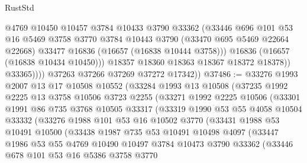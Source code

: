 \begin{lexlean}{RustStd}
\begin{coremodule}
                      @4769
                      @10450
                      @10457
                      @3784
                      @10433
                      @3790
                      @33362
                      (@33446
                        @696
                        @101
                        @53
                        @16
                        @5469
                        @3758
                        @3770
                        @3784
                        @10443
                        @3790
                        (@33470 @695 @5469 @22664 @22668)
                        @33477
                        @16836
                        (@16657 (@16838 @10444 @3758)))
                      @16836
                      (@16657 (@16838 @10434 @10450)))
                    @18357
                    @18360
                    @18363
                    @18367
                    @18372
                    @18378))
                @33365))))
        @37263
        @37266
        @37269
        @37272
        @17342))
@37486 := @33276
    @1993
    @2007
    @13
    @17
    @10508
    @10552
    (@33284
      @1993
      @13
      @10508
      (@37235
        @1992
        @2225
        @13
        @3758
        @10506
        @3723
        @2255
        (@33271
          @1992
          @2225
          @10506
          (@33301
            @1991
            @86
            @735
            @3768
            @10505
            @33317
            (@33319
              @1990
              @53
              @55
              @4058
              @10504
              @33332
              (@33276
                @1988
                @101
                @53
                @16
                @10502
                @3770
                (@33431
                  @1988
                  @53
                  @10491
                  @10500
                  (@33438
                    @1987
                    @735
                    @53
                    @10491
                    @10498
                    @4097
                    (@33447
                      @1986
                      @53
                      @55
                      @4769
                      @10490
                      @10497
                      @3784
                      @10473
                      @3790
                      @33362
                      (@33446
                        @678
                        @101
                        @53
                        @16
                        @5386
                        @3758
                        @3770

\end{coremodule}
\end{lexlean}
